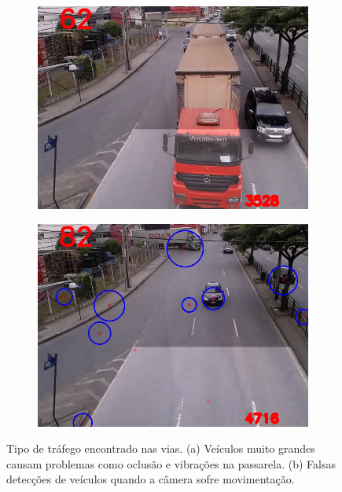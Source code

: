 \begin{figure}[ht]
  \begin{center}
    \begin{subfigure}[b]{.49\textwidth}
      \begin{center}
        \includegraphics[width=1\linewidth]{imgs/veiculo_grande.png}
      \end{center}
      \caption{}
      \label{fig:veiculo_grande}
    \end{subfigure}
    \begin{subfigure}[b]{.49\textwidth}
      \begin{center}
        \includegraphics[width=1\linewidth]{imgs/camera_moveu.png}
      \end{center}
      \caption{}
      \label{fig:camera_moveu}
    \end{subfigure}
  \end{center}
  \caption{Tipo de tráfego encontrado nas vias. (a) Veículos muito grandes causam problemas como oclusão e vibrações na passarela. (b) Falsas detecções de veículos quando a câmera sofre movimentação.}
  \label{fig:tipo_de_trafego}
\end{figure}

